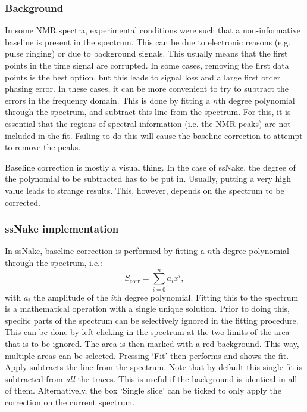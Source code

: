 \documentclass[11pt,a4paper]{article}
\begin{document}
\subsubsection*{Background}
In some NMR spectra, experimental conditions were such that a non-informative baseline is present in the spectrum. This can be due to electronic reasons (e.g. pulse ringing) or due to background signals. This usually means that the first points in the time signal are corrupted. In some cases, removing the first data points is the best option, but this leads to signal loss and a large first order phasing error. In these cases, it can be more convenient to try to subtract the errors in the frequency domain. This is done by fitting a $n$th degree polynomial through  the spectrum, and subtract this line from the spectrum. For this, it is essential that the regions of spectral information (i.e. the NMR peaks) are not included in the fit. Failing to do this will cause the baseline correction to attempt to remove the peaks. 

Baseline correction is mostly a visual thing. In the case of ssNake, the degree of the polynomial to be subtracted has to be put in. Usually, putting a very high value leads to strange results. This, however, depends on the spectrum to be corrected.

\subsubsection*{ssNake implementation}
In ssNake, baseline correction is performed by fitting a $n$th degree polynomial through the spectrum, i.e.:
\begin{equation*}
S_\text{corr} = \sum_{i=0}^n a_i x^i ,
\end{equation*}
with $a_i$ the amplitude of the $i$th degree polynomial. Fitting this to the spectrum is a mathematical operation with a single unique solution. Prior to doing this, specific parts of the spectrum can be selectively ignored in the fitting procedure. This can be done by left clicking in the spectrum at the two limits of the area that is to be ignored. The area is then marked with a red background. This way, multiple areas can be selected. Pressing  `Fit' then performs and shows the fit. Apply subtracts the line from the spectrum. Note that by default this single fit is subtracted from \textit{all} the traces. This is useful if the background is identical in all of them. Alternatively, the box `Single slice' can be ticked to only apply the correction on the current spectrum.
\end{document}
